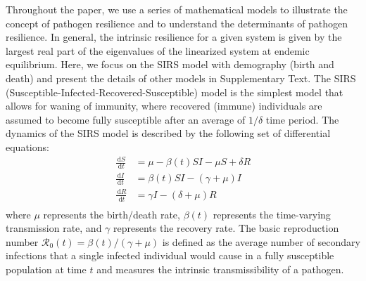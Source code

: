 \documentclass[12pt]{article}
\newcommand{\dd}[1]{\ensuremath{\, \mathrm{d}#1}}
\begin{document}
Throughout the paper, we use a series of mathematical models to illustrate the concept of pathogen resilience and to understand the determinants of pathogen resilience.
In general, the intrinsic resilience for a given system is given by the largest real part of the eigenvalues of the linearized system at endemic equilibrium.
Here, we focus on the SIRS model with demography (birth and death) and present the details of other models in Supplementary Text.
The SIRS (Susceptible-Infected-Recovered-Susceptible) model is the simplest model that allows for waning of immunity, where recovered (immune) individuals are assumed to become fully susceptible after an average of $1/\delta$ time period.
The dynamics of the SIRS model is described by the following set of differential equations:
\begin{align}
\frac{\dd S}{\dd t} &= \mu - \beta(t) SI - \mu S + \delta R \\
\frac{\dd I}{\dd t} &= \beta(t) SI - (\gamma + \mu) I \\
\frac{\dd R}{\dd t} &= \gamma I - (\delta + \mu) R \\
\end{align}
where $\mu$ represents the birth/death rate, $\beta(t)$ represents the time-varying transmission rate, and $\gamma$ represents the recovery rate.
The basic reproduction number $\mathcal R_0(t) = \beta(t)/(\gamma + \mu)$ is defined as the average number of secondary infections that a single infected individual would cause in a fully susceptible population at time $t$ and measures the intrinsic transmissibility of a pathogen.
\end{document}
